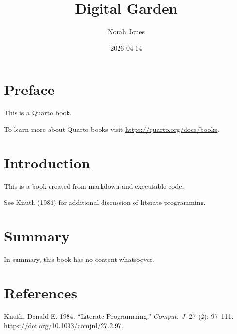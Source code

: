 \documentclass[
  letterpaper,
  DIV=11,
  numbers=noendperiod]{scrreprt}
\title{Digital Garden}
\author{Norah Jones}
\date{2026-04-14}
\newlength{\cslhangindent}
\newenvironment{CSLReferences}[2] %
 {\begin{list}{}{%
  \setlength{\itemindent}{0pt}
  \setlength{\leftmargin}{0pt}
  \setlength{\parsep}{0pt}
  \ifodd #1
   \setlength{\leftmargin}{\cslhangindent}
   \setlength{\itemindent}{-1\cslhangindent}
  \fi
  \setlength{\itemsep}{#2\baselineskip}}}
 {\end{list}}
\renewcommand*\contentsname{Table of contents}
\newcommand\contentsname{Table of contents}
\begin{document}
\maketitle

\renewcommand*\contentsname{Table of contents}
{
\hypersetup{linkcolor=}
\setcounter{tocdepth}{2}
\tableofcontents
}


\chapter*{Preface}\label{preface}


This is a Quarto book.

To learn more about Quarto books visit
\url{https://quarto.org/docs/books}.


\chapter{Introduction}\label{introduction}

This is a book created from markdown and executable code.

See Knuth (1984) for additional discussion of literate programming.


\chapter{Summary}\label{summary}

In summary, this book has no content whatsoever.


\chapter*{References}\label{references}


\label{refs}
\begin{CSLReferences}{1}{0}
Knuth, Donald E. 1984. {``Literate Programming.''} \emph{Comput. J.} 27
(2): 97--111. \url{https://doi.org/10.1093/comjnl/27.2.97}.

\end{CSLReferences}
\end{document}
